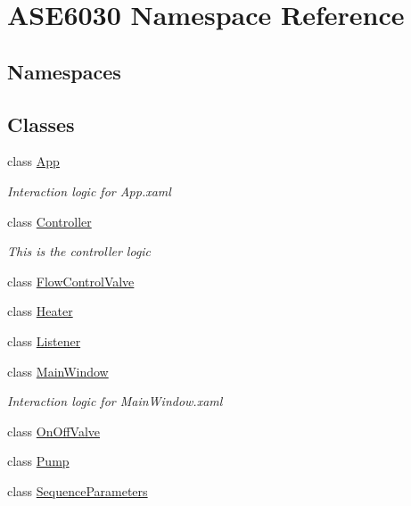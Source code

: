 \hypertarget{namespace_a_s_e6030}{}\section{A\+S\+E6030 Namespace Reference}
\label{namespace_a_s_e6030}
\subsection*{Namespaces}
\begin{DoxyCompactItemize}
\end{DoxyCompactItemize}
\subsection*{Classes}
\begin{DoxyCompactItemize}
\item 
class \hyperlink{class_a_s_e6030_1_1_app}{App}
\begin{DoxyCompactList}\small\item\em Interaction logic for App.\+xaml \end{DoxyCompactList}\item 
class \hyperlink{class_a_s_e6030_1_1_controller}{Controller}
\begin{DoxyCompactList}\small\item\em This is the controller logic \end{DoxyCompactList}\item 
class \hyperlink{class_a_s_e6030_1_1_flow_control_valve}{Flow\+Control\+Valve}
\item 
class \hyperlink{class_a_s_e6030_1_1_heater}{Heater}
\item 
class \hyperlink{class_a_s_e6030_1_1_listener}{Listener}
\item 
class \hyperlink{class_a_s_e6030_1_1_main_window}{Main\+Window}
\begin{DoxyCompactList}\small\item\em Interaction logic for Main\+Window.\+xaml \end{DoxyCompactList}\item 
class \hyperlink{class_a_s_e6030_1_1_on_off_valve}{On\+Off\+Valve}
\item 
class \hyperlink{class_a_s_e6030_1_1_pump}{Pump}
\item 
class \hyperlink{class_a_s_e6030_1_1_sequence_parameters}{Sequence\+Parameters}
\end{DoxyCompactItemize}
